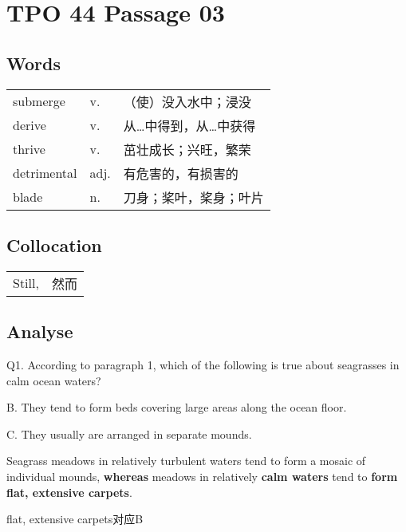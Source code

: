 \section{TPO 44 Passage 03}

\subsection{Words}

\begin{tabular}{lll}
    submerge    & v.   & （使）没入水中；浸没  \\
    derive      & v.   & 从…中得到，从…中获得 \\
    thrive      & v.   & 茁壮成长；兴旺，繁荣  \\
    detrimental & adj. & 有危害的，有损害的   \\
    blade       & n.   & 刀身；桨叶，桨身；叶片 \\
\end{tabular}

\subsection{Collocation}

\begin{tabular}{ll}
    Still, & 然而 \\
\end{tabular}

\newpage

\subsection{Analyse}

\begin{blk}
    \begin{qst}
        Q1. According to paragraph 1, which of the following is true about seagrasses in calm ocean waters?
    \end{qst}

    \begin{chc}
        B. They tend to form beds covering large areas along the ocean floor.

        C. They usually are arranged in separate mounds.
    \end{chc}

    \begin{psgq}
        Seagrass meadows in relatively turbulent waters tend to form a mosaic of individual mounds, \textbf{whereas} meadows in relatively \textbf{calm waters} tend to \textbf{form flat, extensive carpets}.
    \end{psgq}

    \begin{nlz}
        flat, extensive carpets对应B
    \end{nlz}
\end{blk}

\newpage
